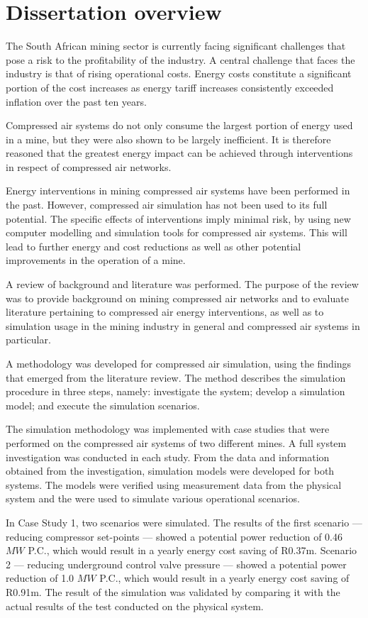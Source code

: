 	 \section{Dissertation overview}
		The South African mining sector is currently facing significant challenges that pose a risk to the profitability of the industry. A central challenge that faces the industry is that of rising operational costs. Energy costs constitute a significant portion of the cost increases as energy tariff increases consistently exceeded inflation over the past ten years.
	 \par
		Compressed air systems do not only consume the largest portion of energy used in a mine, but they were also shown to be largely inefficient. It is therefore reasoned that the greatest energy impact can be achieved through interventions in respect of compressed air networks.
	 \par 
		Energy interventions in mining compressed air systems have been performed in the past. However, compressed air simulation has not been used to its full potential. The specific effects of interventions imply minimal risk, by using new computer modelling and simulation tools for compressed air systems. This will lead to further energy and cost reductions as well as other potential improvements in the operation of a mine.
	 \par 
	 A review of background and literature was performed. The purpose of the review was to provide background on mining compressed air networks and to evaluate literature pertaining to compressed air energy interventions, as well as to simulation usage in the mining industry in general and compressed air systems in particular.
	 \par 
		A methodology was developed for compressed air simulation, using the findings that emerged from the literature review. The method describes the simulation procedure in three steps, namely: investigate the system; develop a simulation model; and execute the simulation scenarios.
	 \par 
The simulation methodology was implemented with case studies that were performed on the compressed air systems of two different mines. A full system investigation was conducted in each study. From the data and information obtained from the investigation, simulation models were developed for both systems. The models were verified using measurement data from the physical system and the were used to simulate various operational scenarios.
	 \par 
In Case Study 1, two scenarios were simulated. The results of the first scenario --- reducing compressor  set-points --- showed a potential power reduction of 0.46 $MW$ P.C., which would result in a yearly energy cost saving of R0.37m. Scenario 2 --- reducing underground control valve pressure --- showed a potential power reduction of 1.0 $MW$ P.C., which would result in a yearly energy cost saving of R0.91m. The result of the simulation was validated by comparing it with the actual results of the test conducted on the physical system.
